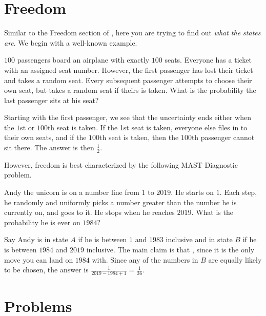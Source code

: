 \documentclass[mast]{lucky}
\begin{document}
\section{Freedom}

Similar to the Freedom section of , here you are trying to find out \textit{what the states are}. We begin with a well-known example.

\begin{exam}
$100$ passengers board an airplane with exactly $100$ seats. Everyone has a ticket with an assigned seat number. However, the first passenger has lost their ticket and takes a random seat. Every subsequent passenger attempts to choose their own seat, but takes a random seat if theirs is taken. What is the probability the last passenger sits at his seat?
\end{exam}

\begin{sol}
Starting with the first passenger, we see that the uncertainty ends either when the $1$st or $100$th seat is taken. If the 1st seat is taken, everyone else files in to their own seats, and if the $100$th seat is taken, then the $100$th passenger cannot sit there. The answer is then $\frac{1}{2}.$
\end{sol}

However, freedom is best characterized by the following MAST Diagnostic problem.

\begin{exam}
Andy the unicorn is on a number line from $1$ to $2019.$ He starts on $1.$ Each step, he randomly and uniformly picks a number greater than the number he is currently on, and goes to it. He stops when he reaches $2019.$ What is the probability he is ever on $1984?$
\end{exam}

\begin{sol}
Say Andy is in state $A$ if he is between $1$ and $1983$ inclusive and in state $B$ if he is between $1984$ and $2019$ inclusive. The main claim is that , since it is the only move you can land on $1984$ with. Since any of the numbers in $B$ are equally likely to be chosen, the answer is $\frac{1}{2019-1984+1}=\frac{1}{36}.$
\end{sol}

\pagebreak

\section{Problems}
\end{document}
